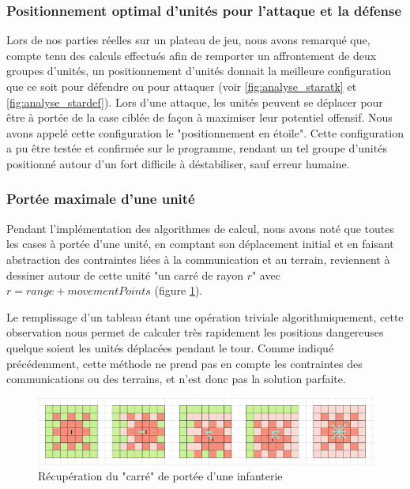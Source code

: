 \documentclass[a4paper]{report}
\begin{document}
\subsubsection{Positionnement optimal d'unités pour l'attaque et la défense}
Lors de nos parties réelles sur un plateau de jeu, nous avons remarqué que, compte tenu des calculs effectués afin de remporter un affrontement de deux groupes d'unités, un positionnement d'unités donnait la meilleure configuration que ce soit pour défendre ou pour attaquer (voir \ref{fig:analyse_staratk} et \ref{fig:analyse_stardef}). Lors d'une attaque, les unités peuvent se déplacer pour être à portée de la case ciblée de façon à maximiser leur potentiel offensif. Nous avons appelé cette configuration le "positionnement en étoile". Cette configuration a pu être testée et confirmée sur le programme, rendant un tel groupe d'unités positionné autour d'un fort difficile à déstabiliser, sauf erreur humaine.


\subsubsection{Portée maximale d'une unité}
\label{sec:rangeMaxUnit}
Pendant l'implémentation des algorithmes de calcul, nous avons noté que toutes les cases à portée d'une unité, en comptant son déplacement initial et en faisant abstraction des contraintes liées à la communication et au terrain, reviennent à dessiner autour de cette unité "un carré de rayon $r$" avec $r = range + movementPoints$ (figure \ref{fig:analyse_fastcomp}).

Le remplissage d'un tableau étant une opération triviale algorithmiquement, cette observation nous permet de calculer très rapidement les positions dangereuses quelque soient les unités déplacées pendant le tour. Comme indiqué précédemment, cette méthode ne prend pas en compte les contraintes des communications ou des terrains, et n'est donc pas la solution parfaite.

\begin{figure}[!h]
\centering
\includegraphics[width=1.0\textwidth]{screensAnalyse/fastRange}
\caption{Récupération du "carré" de portée d'une infanterie}\label{fig:analyse_fastcomp}
\end{figure}
\end{document}

